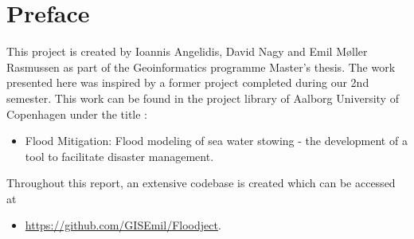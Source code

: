 


\begingroup

\let\clearpage\relax
\let\cleardoublepage\relax
\let\cleardoublepage\relax

\chapter*{Preface} %
This project is created by Ioannis Angelidis, David Nagy and Emil Møller Rasmussen as part of the Geoinformatics programme Master's thesis. The work presented here was inspired by a former project completed during our 2nd semester. This work can be found in the project library of Aalborg University of Copenhagen under the title :
\begin{itemize}
\item Flood Mitigation: Flood modeling of sea water stowing - the development of a tool to facilitate disaster management.
\end{itemize}

Throughout this report, an extensive codebase is created which can be accessed at

\begin{itemize}
\item \url{https://github.com/GISEmil/Floodject}. 
\end{itemize}

\noindent 

\bigskip

\endgroup